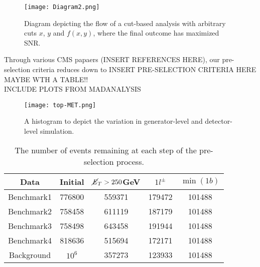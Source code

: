 \begin{figure}[htbp]
    \centering
    \texttt{[image: Diagram2.png]}
    \caption{Diagram depicting the flow of a cut-based analysis with arbitrary cuts $x$, $y$ and $f(x,y)$, where the final outcome has maximized SNR.}
    \label{fig:cut}
\end{figure}

Through various CMS papaers (INSERT REFERENCES HERE), our pre-selection criteria reduces down to INSERT PRE-SELECTION CRITERIA HERE MAYBE WTH A TABLE!!\\
INCLUDE PLOTS FROM MADANALYSIS

\begin{figure}[htbp]
    \centering
    \texttt{[image: top-MET.png]}
    \caption{A histogram to depict the variation in generator-level and detector-level simulation.}
    \label{fig:topMET}
\end{figure}


\begin{table}[htbp]
    \centering
    \begin{tabular}{c|c|c|c|c} 
    \toprule
    Data & Initial & $\cancel{\it{E}}_{T}>250$GeV & $1l^\pm$ & $\min(1b)$ \\
    \midrule
    \rowcolor{gray!6} Benchmark1 & 776800 & 559371 & 179472 & 101488 \\
    Benchmark2 & 758458 & 611119 & 187179 & 101488 \\
    \rowcolor{gray!6} Benchmark3 & 758498 & 643458 & 191944 & 101488 \\
    Benchmark4 & 818636 & 515694 & 172171 &101488  \\
    \rowcolor{gray!6} Background & $10^6$ & 357273 & 123933 & 101488 \\
    \bottomrule
    \end{tabular}
    \caption{The number of events remaining at each step of the pre-selection process.} 
    \label{tab:benchmarks}
\end{table}